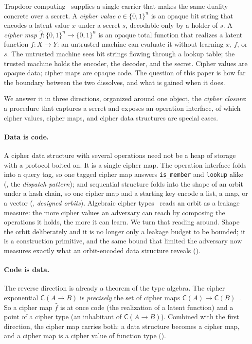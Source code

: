 \documentclass[11pt]{article}
\theoremstyle{definition}
\theoremstyle{plain}
\theoremstyle{definition}
\theoremstyle{remark}
\newcommand{\fhat}{\hat{f}}
\newcommand{\cipher}[1]{\mathsf{C}(#1)}
\newcommand{\B}{\{0,1\}}
\begin{document}
Trapdoor computing~\cite{towell2026cipher} supplies a single carrier
that makes the same duality concrete over a secret. A \emph{cipher
value} $c \in \B^n$ is an opaque bit string that encodes a latent
value $x$ under a secret $s$, decodable only by a holder of $s$. A
\emph{cipher map} $\fhat : \B^n \to \B^n$ is an opaque total function
that realizes a latent function $f : X \to Y$: an untrusted machine
can evaluate it without learning $x$, $f$, or $s$. The untrusted
machine sees bit strings flowing through a lookup table; the trusted
machine holds the encoder, the decoder, and the secret. Cipher values
are opaque data; cipher maps are opaque code. The question of this
paper is how far the boundary between the two dissolves, and what is
gained when it does.

We answer it in three directions, organized around one object, the
\emph{cipher closure}: a procedure that captures a secret and exposes
an operation interface, of which cipher values, cipher maps, and
cipher data structures are special cases.

\paragraph{Data is code.} A cipher data structure with several
operations need not be a heap of storage with a protocol bolted on. It
is a single cipher map. The operation interface folds into a query
tag, so one tagged cipher map answers \texttt{is\_member} and
\texttt{lookup} alike (, the \emph{dispatch
pattern}); and sequential structure folds into the shape of an orbit
under a hash chain, so one cipher map and a starting key encode a list,
a map, or a vector (, \emph{designed
orbits}). Algebraic cipher types~\cite{towell2026algebraic} reads an
orbit as a leakage measure: the more cipher values an adversary can
reach by composing the operations it holds, the more it can learn. We
turn that reading around. Shape the orbit deliberately and it is no
longer only a leakage budget to be bounded; it is a construction
primitive, and the same bound that limited the adversary now measures
exactly what an orbit-encoded data structure reveals
().

\paragraph{Code is data.} The reverse direction is already a theorem
of the type algebra. The cipher exponential $\cipher{A \to B}$ is
\emph{precisely} the set of cipher maps $\cipher{A} \to
\cipher{B}$~\cite[Prop.~4.3]{towell2026algebraic}. So a cipher map
$\fhat$ is at once code (the realization of a latent function) and a
point of a cipher type (an inhabitant of $\cipher{A \to B}$). Combined
with the first direction, the cipher map carries both: a data
structure becomes a cipher map, and a cipher map is a cipher value of
function type ().
\end{document}
